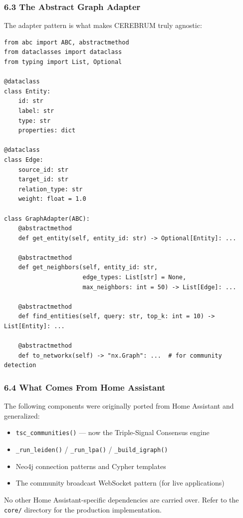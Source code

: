\documentclass[10pt,journal,compsoc]{IEEEtran}
\begin{document}
\subsubsection{6.3 The Abstract Graph Adapter}

The adapter pattern is what makes CEREBRUM truly agnostic:

\begin{lstlisting}
from abc import ABC, abstractmethod
from dataclasses import dataclass
from typing import List, Optional

@dataclass
class Entity:
    id: str
    label: str
    type: str
    properties: dict

@dataclass
class Edge:
    source_id: str
    target_id: str
    relation_type: str
    weight: float = 1.0

class GraphAdapter(ABC):
    @abstractmethod
    def get_entity(self, entity_id: str) -> Optional[Entity]: ...

    @abstractmethod
    def get_neighbors(self, entity_id: str,
                      edge_types: List[str] = None,
                      max_neighbors: int = 50) -> List[Edge]: ...

    @abstractmethod
    def find_entities(self, query: str, top_k: int = 10) -> List[Entity]: ...

    @abstractmethod
    def to_networkx(self) -> "nx.Graph": ...  # for community detection
\end{lstlisting}

\subsubsection{6.4 What Comes From Home Assistant}

The following components were originally ported from Home Assistant and generalized:

\begin{itemize}
\item \texttt{tsc\_communities()} — now the Triple-Signal Consensus engine
\item \texttt{\_run\_leiden()} / \texttt{\_run\_lpa()} / \texttt{\_build\_igraph()}
\item Neo4j connection patterns and Cypher templates
\item The community broadcast WebSocket pattern (for live appli\-cations)

\end{itemize}
No other Home Assistant-specific depen\-dencies are carried over. Refer to the \texttt{core/} directory for the production imple\-mentation.
\end{document}
